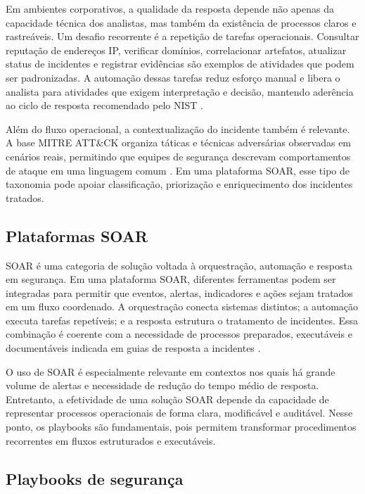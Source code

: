 \documentclass[article,a4paper,12pt,english,brazil,sumario=tradicional]{abntex2}
\begin{document}
Em ambientes corporativos, a qualidade da resposta depende não apenas da capacidade técnica dos analistas, mas também da existência de processos claros e rastreáveis. Um desafio recorrente é a repetição de tarefas operacionais. Consultar reputação de endereços IP, verificar domínios, correlacionar artefatos, atualizar status de incidentes e registrar evidências são exemplos de atividades que podem ser padronizadas. A automação dessas tarefas reduz esforço manual e libera o analista para atividades que exigem interpretação e decisão, mantendo aderência ao ciclo de resposta recomendado pelo NIST \cite{nist2012}.

Além do fluxo operacional, a contextualização do incidente também é relevante. A base MITRE ATT\&CK organiza táticas e técnicas adversárias observadas em cenários reais, permitindo que equipes de segurança descrevam comportamentos de ataque em uma linguagem comum \cite{mitreAttack}. Em uma plataforma SOAR, esse tipo de taxonomia pode apoiar classificação, priorização e enriquecimento dos incidentes tratados.

\subsection{Plataformas SOAR}

SOAR é uma categoria de solução voltada à orquestração, automação e resposta em segurança. Em uma plataforma SOAR, diferentes ferramentas podem ser integradas para permitir que eventos, alertas, indicadores e ações sejam tratados em um fluxo coordenado. A orquestração conecta sistemas distintos; a automação executa tarefas repetíveis; e a resposta estrutura o tratamento de incidentes. Essa combinação é coerente com a necessidade de processos preparados, executáveis e documentáveis indicada em guias de resposta a incidentes \cite{nist2012}.

O uso de SOAR é especialmente relevante em contextos nos quais há grande volume de alertas e necessidade de redução do tempo médio de resposta. Entretanto, a efetividade de uma solução SOAR depende da capacidade de representar processos operacionais de forma clara, modificável e auditável. Nesse ponto, os playbooks são fundamentais, pois permitem transformar procedimentos recorrentes em fluxos estruturados e executáveis.

\subsection{Playbooks de segurança}
\end{document}
